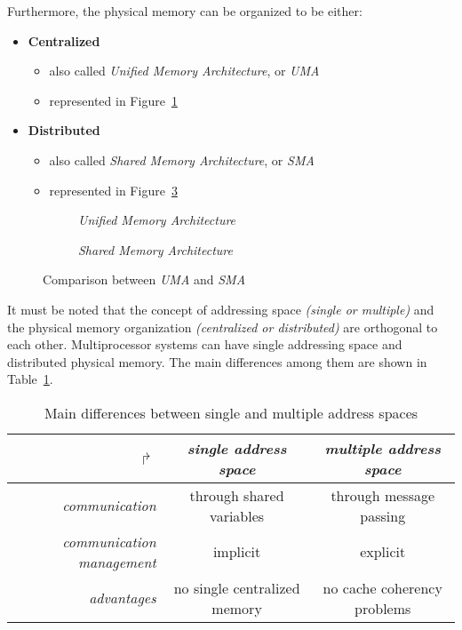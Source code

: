 \documentclass[english]{article}
\begin{document}
\begin{minipage}{\textwidth}
  \bigskip
  Furthermore, the physical memory can be organized to be either:
  \begin{itemize}
    \item \textbf{Centralized}
          \begin{itemize}
            \item also called \textit{Unified Memory Architecture}, or \textit{UMA}
            \item represented in Figure~\ref{subfig:uma}
          \end{itemize}
    \item \textbf{Distributed}
          \begin{itemize}
            \item also called \textit{Shared Memory Architecture}, or \textit{SMA}
            \item represented in Figure~\ref{subfig:sma}
          \end{itemize}
  \end{itemize}
  \bigskip
\end{minipage}

\begin{figure}[htbp]
  \bigskip
  \centering
  \begin{subfigure}[t]{0.495\textwidth}
    \centering
    \caption{\textit{Unified Memory Architecture}}
    \label{subfig:uma}
  \end{subfigure}
  \begin{subfigure}[t]{0.495\textwidth}
    \centering
    \caption{\textit{Shared Memory Architecture}}
    \label{subfig:sma}
  \end{subfigure}
  \caption{Comparison between \textit{UMA} and \textit{SMA}}
  \bigskip
\end{figure}

\bigskip
It must be noted that the concept of addressing space \textit{(single or multiple)} and the physical memory organization \textit{(centralized or distributed)} are orthogonal to each other.
Multiprocessor systems can have single addressing space and distributed physical memory.
The main differences among them are shown in Table~\ref{tab:address-spaces-differences}.

\begin{table}[htbp]
  \begin{tabular}{r|c|c}
    \(\Rsh\)                          & \textit{single address space} & \textit{multiple address space} \\ \hline
    \textit{communication}            & through shared variables      & through message passing         \\
    \textit{communication management} & implicit                      & explicit                        \\
    \textit{advantages}               & no single centralized memory  & no cache coherency problems
  \end{tabular}

  \caption{Main differences between single and multiple address spaces}
  \label{tab:address-spaces-differences}
\end{table}
\end{document}
